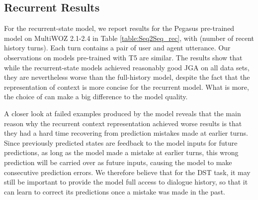 \documentclass[11pt]{article}
\begin{document}
\subsection{Recurrent Results}\label{sec:recresults}

For the recurrent-state model, we report results for the Pegasus pre-trained model on MultiWOZ 2.1-2.4 in Table \ref{table:Seq2Seq_rec}, with  (number of recent history turns). Each turn contains a pair of user and agent utterance. Our observations on models pre-trained with T5 are similar. The results show that while the recurrent-state models achieved reasonably good JGA on all data sets, they are nevertheless worse than the full-history model, despite the fact that the representation of context is more concise for the recurrent model. What is more, the choice of  can make a big difference to the model quality.



\begin{table}[htbp]
\small
\centering
    \centering
    \caption{JGA of the recurrent model pre-trained with Pegasus.
     has the same meaning as in Table \ref{table:Seq2Seq_full}.}
    \label{table:Seq2Seq_rec}
\end{table}

A closer look at failed examples produced by the model reveals that the main reason why the recurrent context representation achieved worse results is that they had a hard time recovering from prediction mistakes made at earlier turns. Since previously predicted states are feedback to the model inputs for future predictions, as long as the model made a mistake at earlier turns, this wrong prediction will be carried over as future inputs, causing the model to make consecutive prediction errors. We therefore believe that for the DST task, it may still be important to provide the model full access to dialogue history, so that it can learn to correct its predictions once a mistake was made in the past.
\end{document}

